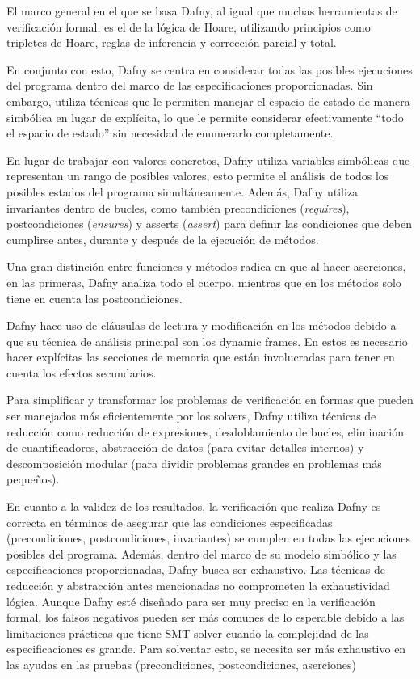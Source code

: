 \documentclass[runningheads]{llncs}
\begin{document}
El marco general en el que se basa Dafny, al igual que muchas herramientas de verificación formal, es el de la lógica de Hoare,
utilizando principios como tripletes de Hoare, reglas de inferencia y corrección parcial y total.

En conjunto con esto, Dafny se centra en considerar todas las posibles ejecuciones del programa dentro del marco de las especificaciones proporcionadas. 
Sin embargo, utiliza técnicas que le permiten manejar el espacio de estado de manera simbólica en lugar de explícita, 
lo que le permite considerar efectivamente ``todo el espacio de estado'' sin necesidad de enumerarlo completamente.

En lugar de trabajar con valores concretos, Dafny utiliza variables simbólicas que representan un rango de posibles valores,
esto permite el análisis de todos los posibles estados del programa simultáneamente.
Además, Dafny utiliza invariantes dentro de bucles, como también precondiciones (\textit{requires}), postcondiciones (\textit{ensures}) y asserts (\textit{assert}) para definir las condiciones 
que deben cumplirse antes, durante y después de la ejecución de métodos.

Una gran distinción entre funciones y métodos radica en que al hacer aserciones, en las primeras, Dafny analiza todo el cuerpo, mientras que en los métodos solo tiene en cuenta las postcondiciones. 

Dafny hace uso de cláusulas de lectura y modificación en los métodos debido a que su técnica de análisis principal son los dynamic frames. En estos es necesario hacer explícitas las secciones de memoria
que están involucradas para tener en cuenta los efectos secundarios.

Para simplificar y transformar los problemas de verificación en formas que pueden ser manejados más eficientemente por los solvers, 
Dafny utiliza técnicas de reducción como reducción de expresiones, desdoblamiento de bucles, eliminación de cuantificadores,
abstracción de datos (para evitar detalles internos) y descomposición modular (para dividir problemas grandes en problemas más pequeños).

En cuanto a la validez de los resultados, la verificación que realiza Dafny es correcta en términos de asegurar que las condiciones
especificadas (precondiciones, postcondiciones, invariantes) se cumplen en todas las ejecuciones posibles del programa. 
Además, dentro del marco de su modelo simbólico y las especificaciones proporcionadas,
Dafny busca ser exhaustivo. Las técnicas de reducción y abstracción antes mencionadas no comprometen la exhaustividad lógica.
Aunque Dafny esté diseñado para ser muy preciso en la verificación formal, 
los falsos negativos pueden ser más comunes de lo esperable debido a las limitaciones prácticas que tiene SMT solver
cuando la complejidad de las especificaciones es grande. Para solventar esto, se necesita ser más exhaustivo en las ayudas en las pruebas (precondiciones, postcondiciones, aserciones)
\end{document}
